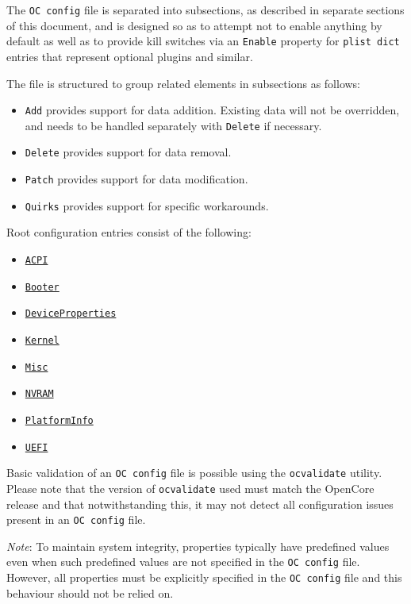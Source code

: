 \documentclass[]{article}
\providecommand{\tightlist}{%
  \setlength{\itemsep}{0pt}\setlength{\parskip}{0pt}}
\begin{document}
The \texttt{OC\ config} file is separated into subsections, as described in
separate sections of this document, and is designed so as to attempt not to
enable anything by default as well as to provide kill switches via an \texttt{Enable}
property for \texttt{plist dict} entries that represent optional plugins and similar.

The file is structured to group related elements in subsections as follows:

\begin{itemize}
\tightlist
\item
  \texttt{Add} provides support for data addition. Existing data will
  not be overridden, and needs to be handled separately with
  \texttt{Delete} if necessary.
\item
  \texttt{Delete} provides support for data removal.
\item
  \texttt{Patch} provides support for data modification.
\item
  \texttt{Quirks} provides support for specific workarounds.
\end{itemize}

Root configuration entries consist of the following:

\begin{itemize}
\tightlist
\item
  \hyperref[acpi]{\texttt{ACPI}}
\item
  \hyperref[booter]{\texttt{Booter}}
\item
  \hyperref[devprops]{\texttt{DeviceProperties}}
\item
  \hyperref[kernel]{\texttt{Kernel}}
\item
  \hyperref[misc]{\texttt{Misc}}
\item
  \hyperref[nvram]{\texttt{NVRAM}}
\item
  \hyperref[platforminfo]{\texttt{PlatformInfo}}
\item
  \hyperref[uefi]{\texttt{UEFI}}
\end{itemize}

Basic validation of an \texttt{OC\ config} file is possible using
the \texttt{ocvalidate} utility. Please note that the version of \texttt{ocvalidate}
used must match the OpenCore release and that notwithstanding this, it may not
detect all configuration issues present in an \texttt{OC\ config} file.

\emph{Note}: To maintain system integrity, properties typically have predefined values even
when such predefined values are not specified in the \texttt{OC\ config} file. However, all
properties must be explicitly specified in the \texttt{OC\ config} file and this behaviour
should not be relied on.
\end{document}
